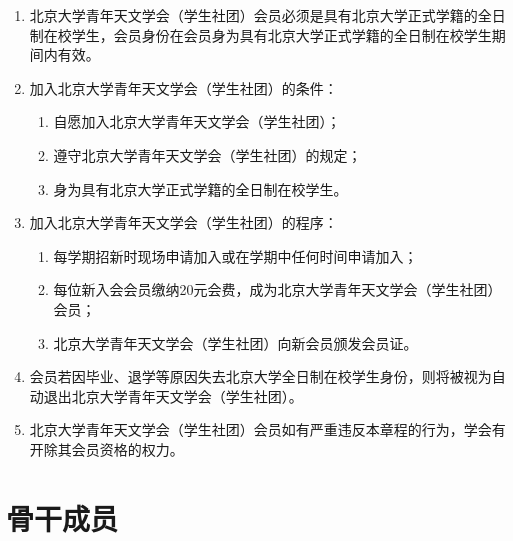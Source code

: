 \begin{enumerate}[resume]
    \item 北京大学青年天文学会（学生社团）会员必须是具有北京大学正式学籍的全日制在校学生，会员身份在会员身为具有北京大学正式学籍的全日制在校学生期间内有效。
    
    \item 加入北京大学青年天文学会（学生社团）的条件：
    
    \begin{enumerate}
        \item 自愿加入北京大学青年天文学会（学生社团）；
        \item 遵守北京大学青年天文学会（学生社团）的规定；
        \item 身为具有北京大学正式学籍的全日制在校学生。
    \end{enumerate}
    
    \item 加入北京大学青年天文学会（学生社团）的程序：
    
    \begin{enumerate}
        \item 每学期招新时现场申请加入或在学期中任何时间申请加入；
        \item 每位新入会会员缴纳20元会费，成为北京大学青年天文学会（学生社团）会员；
        \item 北京大学青年天文学会（学生社团）向新会员颁发会员证。
    \end{enumerate}

    \item 会员若因毕业、退学等原因失去北京大学全日制在校学生身份，则将被视为自动退出北京大学青年天文学会（学生社团）。

    \item 北京大学青年天文学会（学生社团）会员如有严重违反本章程的行为，学会有开除其会员资格的权力。 

\end{enumerate}

\section{骨干成员}

